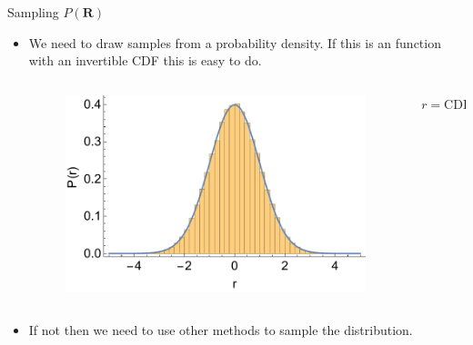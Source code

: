 \documentclass{beamer}
\newcommand{\R}{\mathbf{R}}
\begin{document}
\begin{frame}{Sampling $P(\R)$}
\begin{itemize}
   \item We need to draw samples from a probability density. If this is an function with an invertible CDF this is easy to do.
   \begin{columns}
      \begin{column}{0.7\textwidth}
      \begin{figure}[h]
         \centering
         \includegraphics[width=\textwidth]{figures/gauss.pdf}
      \end{figure}
      \end{column}
      \begin{column}{0.4\textwidth}
      $r=\mathrm{CDF}^{-1}\left({\xi}\right)$
      \end{column}
   \end{columns}
   \item If not then we need to use other methods to sample the distribution.
\end{itemize}
\end{frame}
\end{document}
